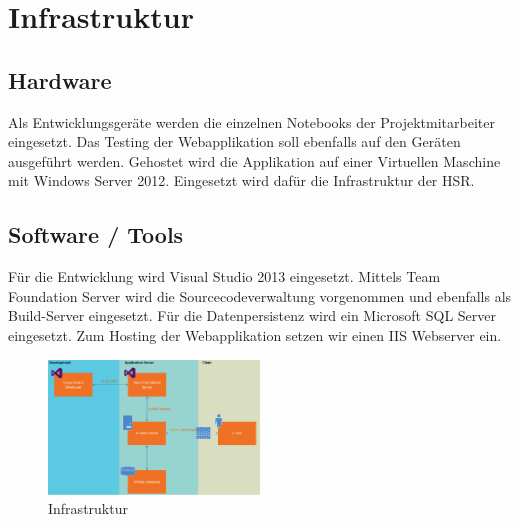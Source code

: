 \chapter{Infrastruktur}

\section{Hardware}
Als Entwicklungsgeräte werden die einzelnen Notebooks der Projektmitarbeiter eingesetzt. Das Testing der Webapplikation soll ebenfalls auf den Geräten ausgeführt werden. Gehostet wird die Applikation auf einer Virtuellen Maschine mit Windows Server 2012. Eingesetzt wird dafür die Infrastruktur der HSR.

\section{Software / Tools}
Für die Entwicklung wird Visual Studio 2013 eingesetzt. Mittels Team Foundation Server wird die Sourcecodeverwaltung vorgenommen und ebenfalls als Build-Server eingesetzt. Für die Datenpersistenz wird ein Microsoft SQL Server eingesetzt. Zum Hosting der Webapplikation setzen wir einen IIS Webserver ein.
\begin{figure}[h]
    \centering
    \includegraphics[width=0.5\textwidth]{content/images/infrastruktur.png}
    \caption{Infrastruktur}
\end{figure}
